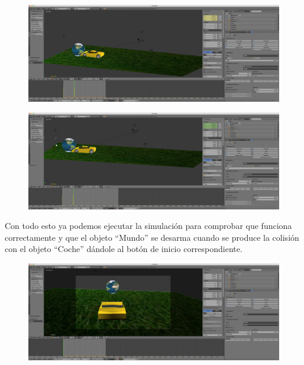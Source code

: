 \documentclass[10pt]{article}
\begin{document}
\begin{figure}[H]
	\begin{center}
	 		\includegraphics[width = 1.00\textwidth]{Imagenes/p5-img16}
	\end{center} 
\end{figure}

\begin{figure}[H]
	\begin{center}
	 		\includegraphics[width = 1.00\textwidth]{Imagenes/p5-img17}
	\end{center} 
\end{figure}

Con todo esto ya podemos ejecutar la simulación para comprobar que funciona correctamente y que el objeto ``Mundo'' se desarma cuando se produce la colisión con el objeto ``Coche'' dándole al botón de inicio correspondiente.\\

\begin{figure}[H]
	\begin{center}
	 		\includegraphics[width = 1.00\textwidth]{Imagenes/p5-img18}
	\end{center} 
\end{figure}
\end{document}
